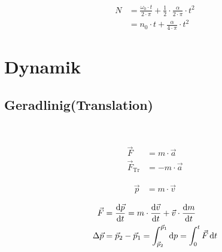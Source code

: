\begin{boxleft}
\end{boxleft}\begin{boxrightshaded}
\begin{align}
N	&=\frac{\omega_0\cdot t}{2\cdot \pi}+\frac{1}{2}\cdot\frac{\alpha}{2\cdot \pi}\cdot t^2\\
	&=n_0\cdot t+\frac{\alpha}{4\cdot\pi}\cdot t^2
\end{align}
\end{boxrightshaded}

\section{Dynamik}
\subsection{Geradlinig(Translation)}
\begin{boxleft}
\\
\end{boxleft}\begin{boxrightshaded}
\begin{align}
\vec{F}&=m\cdot \vec{a}\\
\vec{F}_{\text{Tr}}&=-m\cdot \vec{a}
\end{align}
\end{boxrightshaded}

\begin{boxleft}
\end{boxleft}\begin{boxrightshaded}
\begin{align}
\vec{p}&=m\cdot \vec{v}
\end{align}
\end{boxrightshaded}

\begin{boxleft}
\end{boxleft}\begin{boxrightshaded}
\begin{align}
\vec{F}&=\frac{\diff \vec{p}}{\diff t}=m\cdot\frac{\diff \vec{v}}{\diff t}+\vec{v}\cdot\frac{\diff m}{\diff t}\\
\Delta\vec{p}&=\vec{p}_2-\vec{p}_1=\int_{\vec{p}_2}^{\vec{p}_1}\diff p=\int_0^{t}\vec{F}\diff t
\end{align}
\end{boxrightshaded}

